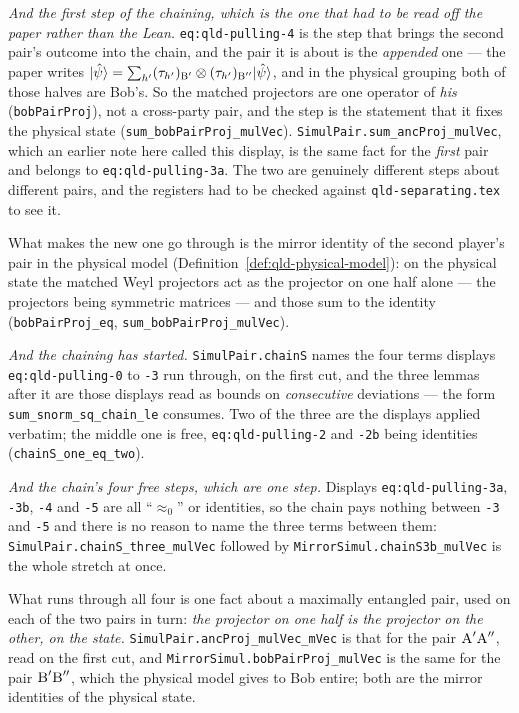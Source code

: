 \emph{And the first step of the chaining, which is the one that had to be read off the paper
rather than the Lean.} \texttt{eq:qld-pulling-4} is the step that brings the second pair's outcome
into the chain, and the pair it is about is the \emph{appended} one --- the paper writes
$|\hat\psi\rangle = \sum_{h'} (\tau_{h'})_{\textsc{B}'} \otimes (\tau_{h'})_{\textsc{B}''}
|\hat\psi\rangle$, and in the physical grouping both of those halves are Bob's. So the matched
projectors are one operator of \emph{his} (\texttt{bobPairProj}), not a cross-party pair, and the
step is the statement that it fixes the physical state
(\texttt{sum\_bobPairProj\_mulVec}). \texttt{SimulPair.sum\_ancProj\_mulVec}, which an
earlier note here called this display, is the same fact for the \emph{first} pair and belongs to
\texttt{eq:qld-pulling-3a}. The two are genuinely different steps about different pairs, and the
registers had to be checked against \texttt{qld-separating.tex} to see it.

What makes the new one go through is the mirror identity of the second player's pair in the
physical model (Definition~\ref{def:qld-physical-model}): on the physical state the matched Weyl
projectors act as the projector on one half alone --- the projectors being symmetric matrices ---
and those sum to the identity (\texttt{bobPairProj\_eq}, \texttt{sum\_bobPairProj\_mulVec}).

\emph{And the chaining has started.} \texttt{SimulPair.chainS} names the four terms displays
\texttt{eq:qld-pulling-0} to \texttt{-3} run through, on the first cut, and the three
lemmas after it are those displays read as bounds on \emph{consecutive} deviations --- the form
\texttt{sum\_snorm\_sq\_chain\_le} consumes. Two of the three are the displays applied
verbatim; the middle one is free, \texttt{eq:qld-pulling-2} and \texttt{-2b} being identities
(\texttt{chainS\_one\_eq\_two}).

\emph{And the chain's four free steps, which are one step.} Displays \texttt{eq:qld-pulling-3a},
\texttt{-3b}, \texttt{-4} and \texttt{-5} are all ``$\approx_0$'' or identities, so the chain pays
nothing between \texttt{-3} and \texttt{-5} and there is no reason to name the three terms
between them: \texttt{SimulPair.chainS\_three\_mulVec} followed by
\texttt{MirrorSimul.chainS3b\_mulVec} is the whole stretch at once.

What runs through all four is one fact about a maximally entangled pair, used on each of the
two pairs in turn: \emph{the projector on one half is the projector on the other, on the state.}
\texttt{SimulPair.ancProj\_mulVec\_mVec} is that for the pair $\textsc{A}'\textsc{A}''$, read on the first
cut, and \texttt{MirrorSimul.bobPairProj\_mulVec} is the same for the pair $\textsc{B}'\textsc{B}''$, which the
physical model gives to Bob entire; both are the mirror identities of the physical state.

